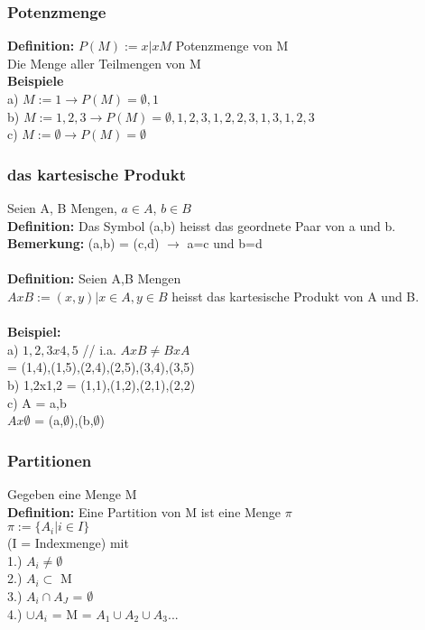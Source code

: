 \documentclass[11pt,a4paper]{article}
\begin{document}
\subsubsection{Potenzmenge}
\textbf{Definition:} $ P(M) := { x | x M } $ Potenzmenge von M\\
Die Menge aller Teilmengen von M\\
\textbf{Beispiele}\\
a) $ M:={1} \rightarrow P(M) = {\emptyset,{1}}$\\
b) $ M:= {1,2,3} \rightarrow P(M) = {\emptyset, {1},{2},{3},{1,2},{2,3},{1,3},{1,2,3}}$\\
c) $ M:= \emptyset \rightarrow P(M) = {\emptyset}$

\subsubsection{das kartesische Produkt}
Seien A, B Mengen, $a \in A$, $b \in B$\\
\textbf{Definition:} Das Symbol (a,b) heisst das geordnete Paar von a und b.\\
\textbf{Bemerkung:} (a,b) = (c,d) $\rightarrow$ a=c und b=d\\\\

\textbf{Definition:} Seien A,B Mengen\\
$AxB := { (x,y) | x \in A, y \in B }$ heisst das kartesische Produkt von A und B.\\\\

\textbf{Beispiel:} \\
a) ${1,2,3} x {4,5}$ // i.a. $AxB \neq BxA$\\
= { (1,4),(1,5),(2,4),(2,5),(3,4),(3,5) } \\
b) {1,2}x{1,2} = {(1,1),(1,2),(2,1),(2,2)}\\
c) A = {a,b}\\
$Ax\emptyset$ = {(a,$\emptyset$),(b,$\emptyset$)}\\

\subsubsection{Partitionen}
Gegeben eine Menge M\\
\textbf{Definition:} Eine Partition von M ist eine Menge $\pi$\\
$\pi := \{ A_i | i \in I \}$ \\
(I = Indexmenge) mit \\
1.) $A_i \neq \emptyset$\\
2.) $A_i \subset$ M \\
3.) $A_i \cap A_J$ = $\emptyset$\\
4.) $\cup A_i$ = M = $ A_1 \cup A_2 \cup A_3 ... $\\\\
\end{document}
